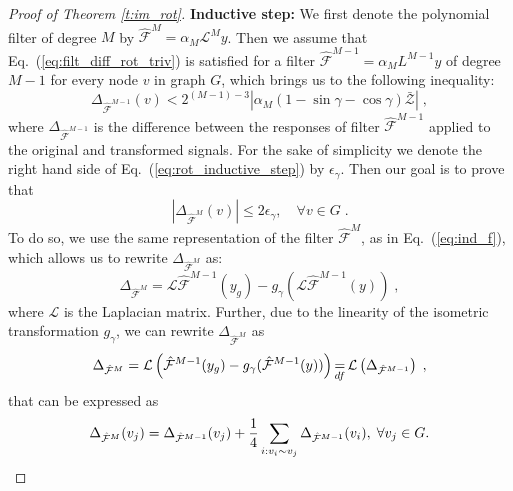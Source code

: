 \documentclass[10pt,journal,compsoc]{IEEEtran}
\newcommand{\df}{\mathop{=}\limits_{df}}
\newcommand{\hmF}{\hat{\mathcal{F}}}
\newcommand{\norm}[1]{\left|#1\right|}
\begin{document}
\begin{proof}[Proof of Theorem \ref{t:im_rot}]
		\textbf{Inductive step:}
		We first denote the polynomial filter of degree $M$ by $\hmF^{M} = \alpha_M \mathcal{L}^{M} y$. Then we assume that Eq.~(\ref{eq:filt_diff_rot_triv}) is satisfied for a filter $\hmF^{M-1} = \alpha_M L^{M-1} y$ of degree $M-1$ for every node $v$ in graph $G$, which brings us to the following inequality:
		\begin{equation}
		\Delta_{\hmF^{M-1}} (v) < 2^{(M-1)-3}\norm{\alpha_M (1 - \sin\gamma - \cos\gamma) \bar{\mathcal{Z}}}\;,
		\label{eq:rot_inductive_step}
		\end{equation}
		\noindent
		where $\Delta_{\hmF^{M-1}}$ is the difference between the responses of filter $\hmF^{M-1}$ applied to the original and transformed signals. For the sake of simplicity we denote the right hand side of Eq.~(\ref{eq:rot_inductive_step}) by $\epsilon_\gamma$. Then our goal is to prove that
		\begin{equation}
		\norm{\Delta_{\hmF^M} (v)} \leq 2 \epsilon_\gamma, \quad \forall v \in G\;.
		\end{equation}
		To do so, we use the same representation of the filter $\hmF^M$, as in Eq.~(\ref{eq:ind_f}), which allows us to rewrite $\Delta_{\hmF^M}$ as:
		\begin{equation}
		\Delta_{\hmF^{M}} = \mathcal{L} \hmF^{M-1}(y_g) - g_\gamma(\mathcal{L}\hmF^{M-1}(y)) \;,
		\end{equation}
		\noindent
		where $\mathcal{L}$ is the Laplacian matrix. Further, due to the linearity of the isometric transformation $g_\gamma$, we can rewrite $\Delta_{\hmF^{M}}$ as
		\begin{equation}
		\small
		\Delta_{\hmF^{M}} = \mathcal{L} \left(\hmF^{M-1}(y_g) - g_\gamma( \hmF^{M-1}(y))\right) \df \mathcal{L} \left(\Delta_{\hmF^{M-1}}\right)\;,
		\label{eq:ind_rot}
		\end{equation}
		\noindent
		that can be expressed as
		\begin{equation}
		\small
		\Delta_{\hmF^{M}} (v_j) = \Delta_{\hmF^{M-1}} (v_j) + \frac{1}{4} \sum\limits_{i: v_i \sim v_j} \Delta_{\hmF^{M-1}} (v_i), \; \forall v_j \in G.
		\label{eq:rot_fin_diff}
		\end{equation}

\end{proof}
\end{document}
